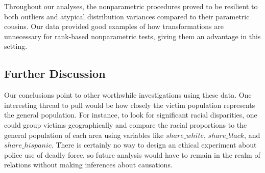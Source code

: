 \par \bigskip Throughout our analyses, the nonparametric procedures proved to be resilient to both outliers and atypical distribution variances compared to their parametric cousins. Our data provided good examples of how transformations are unnecessary for rank-based nonparametric tests, giving them an advantage in this setting.

\newpage

\subsection{Further Discussion}

\par \bigskip Our conclusions point to other worthwhile investigations using these data. One interesting thread to pull would be how closely the victim population represents the general population. For instance, to look for significant racial disparities, one could group victims geographically and compare the racial proportions to the general population of each area using variables like $share\_white$, $share\_black$, and $share\_hispanic$. There is certainly no way to design an ethical experiment about police use of deadly force, so future analysis would have to remain in the realm of relations without making inferences about causations.